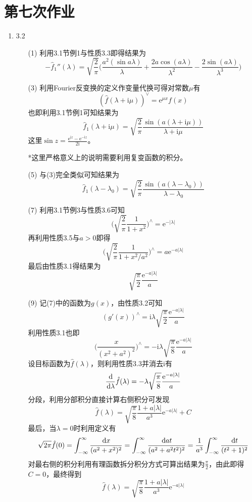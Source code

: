 \documentclass[a4paper,UTF8,fontset=windows,10pt]{ctexart}
\newcommand*{\dr}{\hspace{0.07em}\mathrm{d}}
\newcommand*{\er}{\mathrm{e}}
\newcommand*{\ir}{\mathrm{i}}
\begin{document}
\section{第七次作业}
\begin{enumerate}
    \item 3.2
    \begin{enumerate}
        \item[(1)] 利用3.1节例1与性质3.3即得结果为
        $$-\hat{f}_1''(\lambda)=\sqrt{\frac{2}{\pi}}\bigg(\frac{a^2(\sin a\lambda)}{\lambda}+\frac{2a\cos(a\lambda)}{\lambda^2}-\frac{2\sin(a\lambda)}{\lambda^3}\bigg)$$
        \item[(3)] 利用Fourier反变换的定义作变量代换可得对常数$\mu$有
        $$(\hat{f}(\lambda+\ir\mu))^\vee=\er^{\mu x}f(x)$$
        也即利用3.1节例1可知结果为
        $$\hat{f}_1(\lambda+\ir\mu)=\sqrt{\frac{2}{\pi}}\frac{\sin(a(\lambda+\ir\mu))}{\lambda+\ir\mu}$$
        这里$\sin z=\frac{\er^{\ir z}-\er^{-\ir z}}{2\ir}$。
    
        *这里严格意义上的说明需要利用复变函数的积分。
    
        \item[(5)] 与(3)完全类似可知结果为
        $$\hat{f}_1(\lambda-\lambda_0)=\sqrt{\frac{2}{\pi}}\frac{\sin(a(\lambda-\lambda_0))}{\lambda-\lambda_0}$$
        
        \item[(7)] 利用3.1节例3与性质3.6可知
        $$\bigg(\sqrt{\frac{2}{\pi}}\frac{1}{1+x^2}\bigg)^\wedge=\er^{-|\lambda|}$$
        再利用性质3.5与$a>0$即得
        $$\bigg(\sqrt{\frac{2}{\pi}}\frac{1}{1+x^2/a^2}\bigg)^\wedge=a\er^{-a|\lambda|}$$
        最后由性质3.1得结果为
        $$\sqrt{\frac{\pi}{2}}\frac{\er^{-a|\lambda|}}{a}$$
    
        \item[(9)]  记(7)中的函数为$g(x)$，由性质3.2可知
        $$(g'(x))^\wedge=\ir\lambda\sqrt{\frac{\pi}{2}}\frac{\er^{-a|\lambda|}}{a}$$
        利用性质3.1也即
        $$\bigg(\frac{x}{(x^2+a^2)^2}\bigg)^\wedge=-\ir\lambda\sqrt{\frac{\pi}{8}}\frac{\er^{-a|\lambda|}}{a}$$
        设目标函数为$\hat{f}(\lambda)$，则利用性质3.3并消去$\ir$有
        $$\frac{\dr}{\dr\lambda}\hat{f}(\lambda)=-\lambda\sqrt{\frac{\pi}{8}}\frac{\er^{-a|\lambda|}}{a}$$
        分段，利用分部积分直接计算右侧积分可发现
        $$\hat{f}(\lambda)=\sqrt{\frac{\pi}{8}}\frac{1+a|\lambda|}{a^3}\er^{-a|\lambda|}+C$$
        最后，当$\lambda=0$时利用定义有
        $$\sqrt{2\pi}\hat{f}(0)=\int_{-\infty}^\infty\frac{\dr x}{(a^2+x^2)^2}=\int_{-\infty}^\infty\frac{\dr at}{(a^2+a^2t^2)^2}=\frac{1}{a^3}\int_{-\infty}^\infty\frac{\dr t}{(t^2+1)^2}$$
        对最右侧的积分利用有理函数拆分积分方式可算出结果为$\frac{\pi}{2}$，由此即得$C=0$，最终得到
        $$\hat{f}(\lambda)=\sqrt{\frac{\pi}{8}}\frac{1+a|\lambda|}{a^3}\er^{-a|\lambda|}$$
    \end{enumerate}
    

\end{enumerate}
\end{document}
